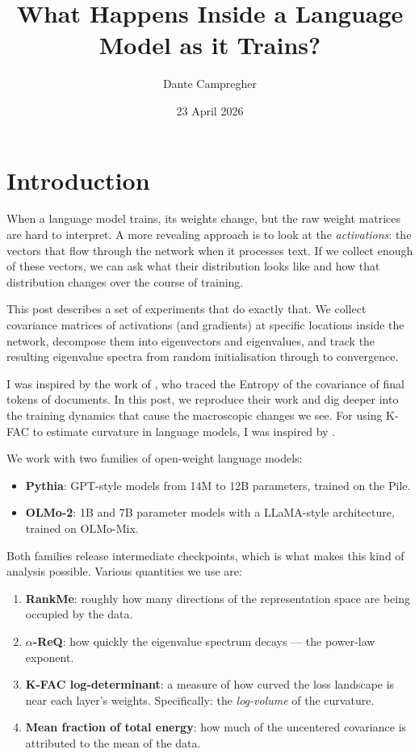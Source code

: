 \documentclass[11pt,a4paper]{article}
\title{\textbf{What Happens Inside a Language Model as it Trains?}\\[0.4em]}
\author{Dante Campregher}
\date{23 April 2026}
\begin{document}
\maketitle

\section{Introduction}

When a language model trains, its weights change, but the raw weight matrices are hard to interpret.
A more revealing approach is to look at the \emph{activations}: the vectors that flow through the network when it processes text.
If we collect enough of these vectors, we can ask what their distribution looks like and how that distribution changes over the course of training.

This post describes a set of experiments that do exactly that.
We collect covariance matrices of activations (and gradients) at specific locations inside the network, decompose them into eigenvectors and eigenvalues, and track the resulting eigenvalue spectra from random initialisation through to convergence.

I was inspired by the work of \citet{li2025tracing}, who traced the Entropy of the covariance of final tokens of documents. In this post, we reproduce their work and dig deeper into the training dynamics that cause the macroscopic changes we see. For using K-FAC to estimate curvature in language models, I was inspired by \citet{merullo2025memorization}.

We work with two families of open-weight language models:
\begin{itemize}
  \item \textbf{Pythia}: GPT-style models from 14M to 12B parameters, trained on the Pile.
  \item \textbf{OLMo-2}: 1B and 7B parameter models with a LLaMA-style architecture, trained on OLMo-Mix.
\end{itemize}

Both families release intermediate checkpoints, which is what makes this kind of analysis possible.
Various quantities we use are:
\begin{enumerate}
  \item \textbf{RankMe}: roughly how many directions of the representation space are being occupied by the data.
  \item \textbf{$\alpha$-ReQ}: how quickly the eigenvalue spectrum decays — the power-law exponent.
  \item \textbf{K-FAC log-determinant}: a measure of how curved the loss landscape is near each layer's weights. Specifically: the \emph{log-volume} of the curvature.
  \item \textbf{Mean fraction of total energy}: how much of the uncentered covariance is attributed to the mean of the data.
\end{enumerate}
\end{document}

